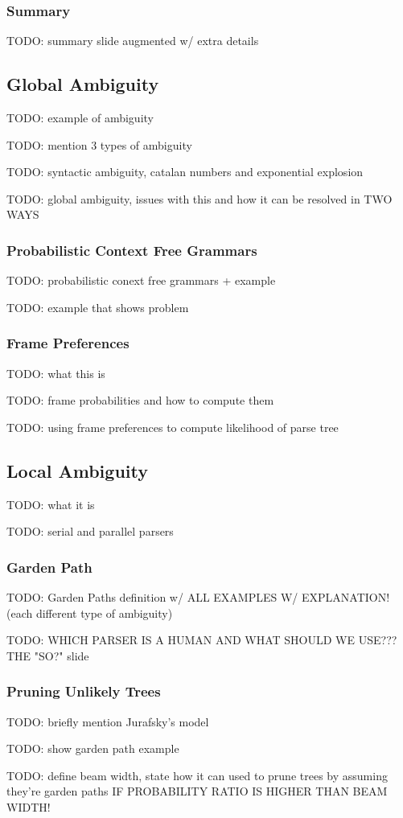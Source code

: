 \documentclass{article}
\begin{document}
\subsubsection{Summary}

TODO: summary slide augmented w/ extra details

\subsection{Global Ambiguity}

TODO: example of ambiguity

TODO: mention 3 types of ambiguity

TODO: syntactic ambiguity, catalan numbers and exponential explosion

TODO: global ambiguity, issues with this and how it can be resolved in TWO WAYS

\subsubsection{Probabilistic Context Free Grammars}

TODO: probabilistic conext free grammars + example

TODO: example that shows problem

\subsubsection{Frame Preferences}

TODO: what this is

TODO: frame probabilities and how to compute them

TODO: using frame preferences to compute likelihood of parse tree

\subsection{Local Ambiguity}

TODO: what it is

TODO: serial and parallel parsers

\subsubsection{Garden Path}

TODO: Garden Paths definition w/ ALL EXAMPLES W/ EXPLANATION!
	(each different type of ambiguity)

TODO: WHICH PARSER IS A HUMAN AND WHAT SHOULD WE USE??? THE "SO?" slide

\subsubsection{Pruning Unlikely Trees}

TODO: briefly mention Jurafsky's model

TODO: show garden path example

TODO: define beam width, state how it can used to prune trees by assuming they're garden paths IF PROBABILITY RATIO IS HIGHER THAN BEAM WIDTH!
\end{document}
